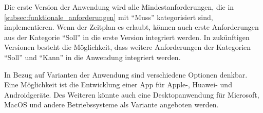 Die erste Version der Anwendung wird alle Mindestanforderungen, die in \autoref{subsec:funktionale_anforderungen} mit \enquote{Muss} kategorisiert sind, implementieren.
Wenn der Zeitplan es erlaubt, können auch erste Anforderungen aus der Kategorie \enquote{Soll} in die erste Version integriert werden.
In zukünftigen Versionen besteht die Möglichkeit, dass weitere Anforderungen der Kategorien \enquote{Soll} und \enquote{Kann} in die Anwendung integriert werden.
\medskip

In Bezug auf Varianten der Anwendung sind verschiedene Optionen denkbar.
Eine Möglichkeit ist die Entwicklung einer App für Apple-, Huawei- und Androidgeräte.
Des Weiteren könnte auch eine Desktopanwendung für Microsoft, MacOS und andere Betriebssysteme als Variante angeboten werden.